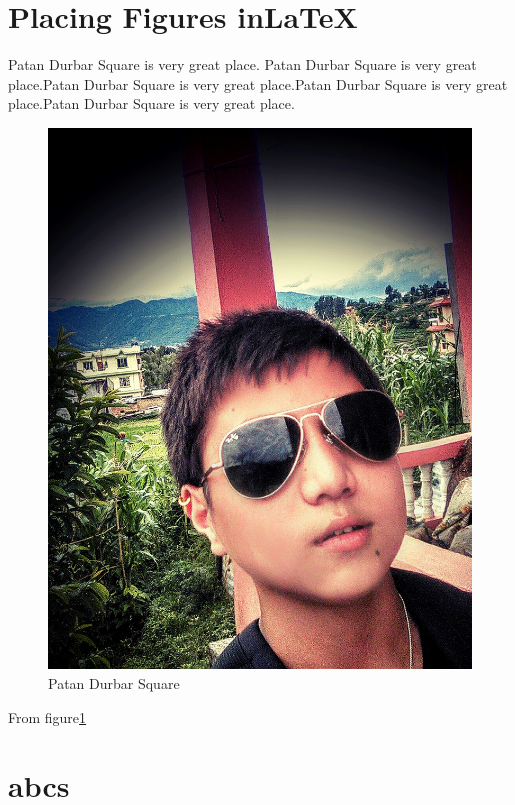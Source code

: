\documentclass[12pt]{report}
\begin{document}
\section{Placing Figures in\LaTeX}
Patan Durbar Square is very great place.
Patan Durbar Square is very great place.Patan Durbar Square is very great place.Patan Durbar Square is very great place.Patan Durbar Square is very great place.
\begin{figure}[h]
\centering
\includegraphics[scale=0.1,angle = 10]{Anish.jpg}
\caption{Patan Durbar Square}
\label{fig:figure1}
\end{figure}

From figure\ref{fig:figure1}
\section{abcs}
\end{document}
